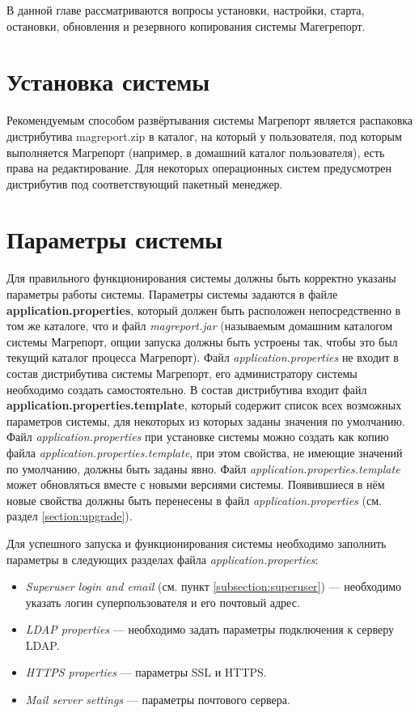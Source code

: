 \documentclass[../user-manual.tex]{subfiles}
\begin{document}
	
	В данной главе рассматриваются вопросы установки, настройки, старта, остановки, обновления и резервного копирования системы Магегрепорт.
	
	\section{Установка системы}

	Рекомендуемым способом развёртывания системы Магрепорт является распаковка дистрибутива magreport.zip в каталог, на который у пользователя, под которым выполняется Магрепорт (например, в домашний каталог пользователя), есть права на редактирование. Для некоторых операционных систем предусмотрен дистрибутив под соответствующий пакетный менеджер.
	
	\section{Параметры системы}
	
	Для правильного функционирования системы должны быть корректно указаны параметры работы системы. Параметры системы задаются в файле \textbf{application.properties}, который должен быть расположен непосредственно в том же каталоге, что и файл \textit{magreport.jar} (называемым домашним каталогом системы Магрепорт, опции запуска должны быть устроены так, чтобы это был текущий каталог процесса Магрепорт). Файл \textit{application.properties} не входит в состав дистрибутива системы Магрепорт, его администратору системы необходимо создать самостоятельно. В состав дистрибутива входит файл \textbf{application.properties.template}, который содержит список всех возможных параметров системы, для некоторых из которых заданы значения по умолчанию. Файл \textit{application.properties} при установке системы можно создать как копию файла \textit{application.properties.template}, при этом свойства, не имеющие значений по умолчанию, должны быть заданы явно. Файл \textit{application.properties.template} может обновляться вместе с новыми версиями системы. Появившиеся в нём новые свойства должны быть перенесены в файл \textit{application.properties} (см. раздел \ref{section:upgrade}).
	
	Для успешного запуска и функционирования системы необходимо заполнить параметры в следующих разделах файла \textit{application.properties}:
	
	\begin{itemize}
		\item \textit{Superuser login and email} (см. пункт \ref{subsection:superuser}) --- необходимо указать логин суперпользователя и его почтовый адрес.
		\item \textit{LDAP properties} --- необходимо задать параметры подключения к серверу LDAP.
		\item \textit{HTTPS properties} --- параметры SSL и HTTPS.
		\item \textit{Mail server settings} --- параметры почтового сервера.
	\end{itemize}
\end{document}
